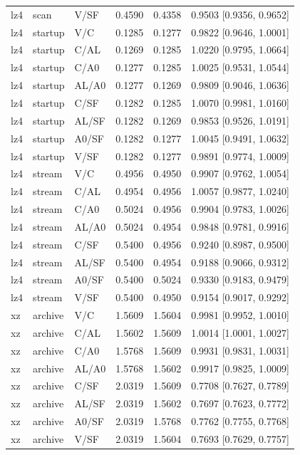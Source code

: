 \begin{longtable}{lllrrl}
lz4 & scan & V/SF & 0.4590 & 0.4358 & 0.9503 [0.9356, 0.9652] \\
lz4 & startup & V/C & 0.1285 & 0.1277 & 0.9822 [0.9646, 1.0001] \\
lz4 & startup & C/AL & 0.1269 & 0.1285 & 1.0220 [0.9795, 1.0664] \\
lz4 & startup & C/A0 & 0.1277 & 0.1285 & 1.0025 [0.9531, 1.0544] \\
lz4 & startup & AL/A0 & 0.1277 & 0.1269 & 0.9809 [0.9046, 1.0636] \\
lz4 & startup & C/SF & 0.1282 & 0.1285 & 1.0070 [0.9981, 1.0160] \\
lz4 & startup & AL/SF & 0.1282 & 0.1269 & 0.9853 [0.9526, 1.0191] \\
lz4 & startup & A0/SF & 0.1282 & 0.1277 & 1.0045 [0.9491, 1.0632] \\
lz4 & startup & V/SF & 0.1282 & 0.1277 & 0.9891 [0.9774, 1.0009] \\
lz4 & stream & V/C & 0.4956 & 0.4950 & 0.9907 [0.9762, 1.0054] \\
lz4 & stream & C/AL & 0.4954 & 0.4956 & 1.0057 [0.9877, 1.0240] \\
lz4 & stream & C/A0 & 0.5024 & 0.4956 & 0.9904 [0.9783, 1.0026] \\
lz4 & stream & AL/A0 & 0.5024 & 0.4954 & 0.9848 [0.9781, 0.9916] \\
lz4 & stream & C/SF & 0.5400 & 0.4956 & 0.9240 [0.8987, 0.9500] \\
lz4 & stream & AL/SF & 0.5400 & 0.4954 & 0.9188 [0.9066, 0.9312] \\
lz4 & stream & A0/SF & 0.5400 & 0.5024 & 0.9330 [0.9183, 0.9479] \\
lz4 & stream & V/SF & 0.5400 & 0.4950 & 0.9154 [0.9017, 0.9292] \\
xz & archive & V/C & 1.5609 & 1.5604 & 0.9981 [0.9952, 1.0010] \\
xz & archive & C/AL & 1.5602 & 1.5609 & 1.0014 [1.0001, 1.0027] \\
xz & archive & C/A0 & 1.5768 & 1.5609 & 0.9931 [0.9831, 1.0031] \\
xz & archive & AL/A0 & 1.5768 & 1.5602 & 0.9917 [0.9825, 1.0009] \\
xz & archive & C/SF & 2.0319 & 1.5609 & 0.7708 [0.7627, 0.7789] \\
xz & archive & AL/SF & 2.0319 & 1.5602 & 0.7697 [0.7623, 0.7772] \\
xz & archive & A0/SF & 2.0319 & 1.5768 & 0.7762 [0.7755, 0.7768] \\
xz & archive & V/SF & 2.0319 & 1.5604 & 0.7693 [0.7629, 0.7757] \\

\end{longtable}
